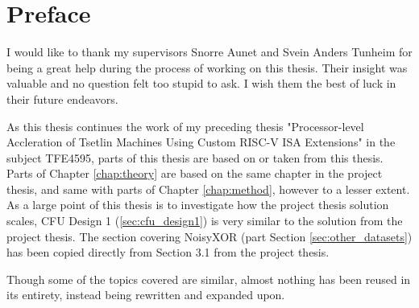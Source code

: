 \chapter*{Preface}

I would like to thank my supervisors Snorre Aunet and Svein Anders Tunheim for being a great help during the process of working on this thesis. Their insight was valuable and no question felt too stupid to ask. I wish them the best of luck in their future endeavors.

\vspace{0.3\linewidth}


As this thesis continues the work of my preceding thesis "Processor-level Accleration of Tsetlin Machines Using Custom RISC-V ISA Extensions" in the subject TFE4595, parts of this thesis are based on or taken from this thesis. Parts of Chapter \ref{chap:theory} are based on the same chapter in the project thesis, and same with parts of Chapter \ref{chap:method}, however to a lesser extent. As a large point of this thesis is to investigate how the project thesis solution scales, CFU Design 1 (\ref{sec:cfu_design1}) is very similar to the solution from the project thesis. The section covering NoisyXOR (part Section \ref{sec:other_datasets}) has been copied directly from Section 3.1 from the project thesis.

Though some of the topics covered are similar, almost nothing has been reused in its entirety, instead being rewritten and expanded upon.